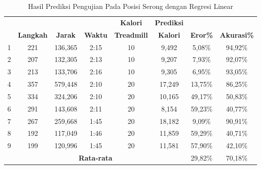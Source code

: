 \begin{longtable}{|c|c|c|c|c|c|c|c|}
  \caption{Hasil Prediksi Pengujian Pada Posisi Serong dengan Regresi Linear}
  \label{tb:PengujianPosisiSerongAnalisaPrediksiRegresi}                                   \\
  \hline
  \rowcolor[HTML]{C0C0C0}
  & & & & \textbf{Kalori} & \textbf{Prediksi} & & \\
  \rowcolor[HTML]{C0C0C0}
  \multirow{-2}{*}{\textbf{Percobaan}} & \multirow{-2}{*}{\textbf{Langkah}} & \multirow{-2}{*}{\textbf{Jarak}} & \multirow{-2}{*}{\textbf{Waktu}} & \textbf{Treadmill} & \textbf{Kalori} & \multirow{-2}{*}{\textbf{Eror\%}} & \multirow{-2}{*}{\textbf{Akurasi\%}} \\
  
  \hline
  1   & 221   & 136,365    & 2:15    & 10    & 9,492    & 5,08\%      & 94,92\%   \\
  \hline  
  2   & 207   & 132,305    & 2:13    & 10    & 9,207    & 7,93\%      & 92,07\%  \\
  \hline
  3   & 213   & 133,706    & 2:16    & 10    & 9,305    & 6,95\%      & 93,05\%   \\
  \hline
  4   & 357   & 579,448    & 2:10    & 20    & 17,249   & 13,75\%     & 86,25\%  \\
  \hline
  5   & 334   & 324,206    & 2:10    & 20    & 10,165   & 49,17\%     & 50,83\%    \\
  \hline
  6   & 291   & 143,608    & 2:11    & 20    & 8,154    & 59,23\%     & 40,77\%   \\
  \hline
  7   & 267   & 259,668    & 1:45    & 20    & 18,182   & 9,09\%      & 90,91\%   \\
  \hline
  8   & 192   & 117,049    & 1:46    & 20    & 11,859   & 59,29\%     & 40,71\%   \\
  \hline
  9   & 199   & 120,996    & 1:45    & 20    & 11,581   & 57,90\%     & 42,10\%   \\
  \hline

  \multicolumn{6}{|c|}{\textbf{Rata-rata}} & 29,82\% & 70,18\%  \\
  \hline
\end{longtable}

